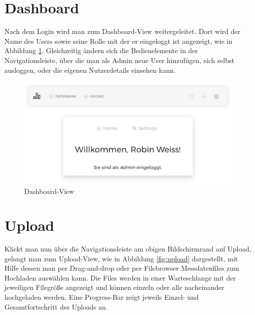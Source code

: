 \section{Dashboard}

Nach dem Login wird man zum Dashboard-View weitergeleitet. Dort wird der Name des Users sowie seine Rolle mit der er eingeloggt ist angezeigt, wie in Abbildung \ref{fig:dashboard}. Gleichzeitig ändern sich die Bedienelemente in der Navigationsleiste, über die man als Admin neue User hinzufügen, sich selbst ausloggen, oder die eigenen Nutzerdetails einsehen kann.

\begin{figure}
\centering
\includegraphics[width=\textwidth]{Figures/dashboard}
\caption{Dashboard-View}
\label{fig:dashboard}
\end{figure}

\section{Upload}

Klickt man nun über die Navigationsleiste am obigen Bildschirmrand auf Upload, gelangt man zum Upload-View, wie in Abbildung \ref{fig:upload} dargestellt, mit Hilfe dessen man per Drag-and-drop oder per Filebrowser Messdatenfiles zum Hochladen auswählen kann. Die Files werden in einer Warteschlange mit der jeweiligen Filegröße angezeigt und können einzeln oder alle nacheinander hochgeladen werden. Eine Progress-Bar zeigt jeweils Einzel- und Gesamtfortschritt des Uploads an.

